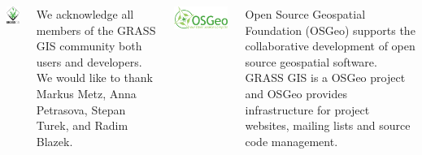 \documentclass[25pt, margin=0mm, innermargin=15mm, blockverticalspace=15mm, colspace=15mm, subcolspace=8mm]{tikzposter}
\begin{document}
\begin{columns}
{\newcommand{\listhspace}{\hspace{0.005\linewidth}}
\newcommand{\listlogowidth}{0.10\linewidth}
\newcommand{\listtextwidth}{0.82\linewidth}

\begin{minipage}{\listlogowidth}
\centering
\includegraphics[width=0.5\linewidth]{grass}
\end{minipage}
\listhspace
\begin{minipage}{\listtextwidth}
We acknowledge all members of the GRASS GIS community both users and developers.
We would like to thank Markus Metz, Anna Petrasova, Stepan Turek, and Radim Blazek.
\end{minipage}

\bigskip

\begin{minipage}{\listlogowidth}
\includegraphics[width=\linewidth]{osgeo}
\end{minipage}
\listhspace
\begin{minipage}{\listtextwidth}
Open Source Geospatial Foundation (OSGeo)
supports the collaborative development of open source geospatial software.
GRASS GIS is a OSGeo project and
OSGeo provides infrastructure for project
websites, mailing lists and source code management.
\end{minipage}

}
\end{columns}
\end{document}

